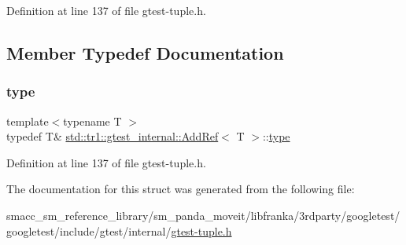 Definition at line 137 of file gtest-\/tuple.\+h.



\subsection{Member Typedef Documentation}
\mbox{\label{structstd_1_1tr1_1_1gtest__internal_1_1AddRef_a1e5616e414125574c1653e3a1fc68491}} 
\subsubsection{\texorpdfstring{type}{type}}
{\footnotesize\ttfamily template$<$typename T $>$ \\
typedef T\& \hyperlink{structstd_1_1tr1_1_1gtest__internal_1_1AddRef}{std\+::tr1\+::gtest\+\_\+internal\+::\+Add\+Ref}$<$ T $>$\+::\hyperlink{structstd_1_1tr1_1_1gtest__internal_1_1AddRef_a1e5616e414125574c1653e3a1fc68491}{type}}



Definition at line 137 of file gtest-\/tuple.\+h.



The documentation for this struct was generated from the following file\+:\begin{DoxyCompactItemize}
\item 
smacc\+\_\+sm\+\_\+reference\+\_\+library/sm\+\_\+panda\+\_\+moveit/libfranka/3rdparty/googletest/googletest/include/gtest/internal/\hyperlink{gtest-tuple_8h}{gtest-\/tuple.\+h}\end{DoxyCompactItemize}
